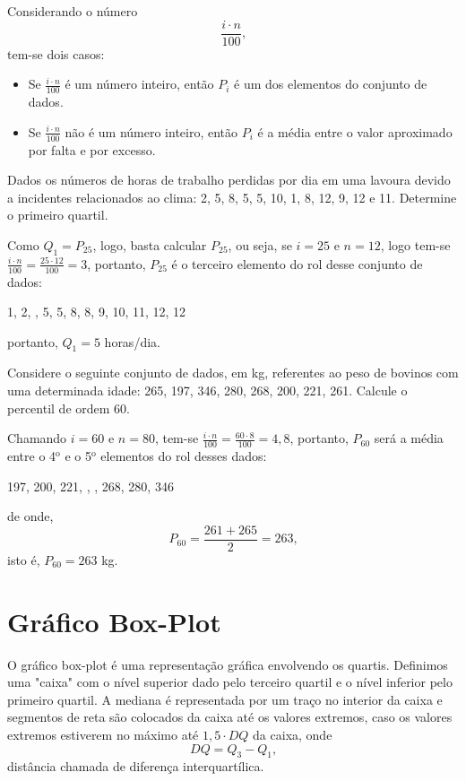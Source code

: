 \documentclass[11pt,fleqn]{book}
\numberwithin{mpicture}{chapter}
\numberwithin{mtable}{chapter}
\numberwithin{mframe}{chapter}
\begin{document}
Considerando o número
\[
\frac{i\cdot n}{100}\text{,}
\]
tem-se dois casos:
\begin{itemize}
	\item Se $\frac{i\cdot n}{100}$ é um número inteiro, então $P_i$ é um dos elementos do conjunto de dados.
	
	\item Se $\frac{i\cdot n}{100}$ não é um número inteiro, então $P_i$ é a média entre o valor aproximado por falta e por excesso.
\end{itemize}

\begin{example}
	Dados os números de horas de trabalho perdidas por dia em uma lavoura devido a incidentes relacionados ao clima: 2, 5, 8, 5, 5, 10, 1, 8, 12, 9, 12 e 11. Determine o primeiro quartil.
	
	Como $Q_1=P_{25}$, logo, basta calcular $P_{25}$, ou seja, se $i=25$ e $n=12$, logo tem-se $\frac{i\cdot n}{100}=\frac{25\cdot 12}{100}=3$, portanto, $P_{25}$ é o terceiro elemento do rol desse conjunto de dados:
	\begin{center}
		1, 2, , 5, 5, 8, 8, 9, 10, 11, 12, 12\text{,}
	\end{center}
	portanto, $Q_1=5$ horas/dia.
\end{example}

\begin{example}
	Considere o seguinte conjunto de dados, em kg, referentes ao peso de bovinos com uma determinada idade: 265, 197, 346, 280, 268, 200, 221, 261. Calcule o percentil de ordem 60.
	
	Chamando $i=60$ e $n=80$, tem-se $\frac{i\cdot n}{100}=\frac{60\cdot 8}{100}=4,8$, portanto, $P_{60}$ será a média entre o 4$^{\text{o}}$ e o 5$^{\text{o}}$ elementos do rol desses dados:
	\begin{center}
		197, 200, 221, , , 268, 280, 346\text{,}
	\end{center}
	de onde,
	\[
		P_{60}=\frac{261 + 265}{2}=263\text{,}
	\]
	isto é, $P_{60}=263$ kg.
\end{example}

\section{Gráfico Box-Plot}

O gráfico box-plot é uma representação gráfica envolvendo os quartis. Definimos uma "caixa" com o nível superior dado pelo terceiro quartil e o nível inferior pelo primeiro quartil. A mediana é representada por um traço no interior da caixa e segmentos de reta são colocados da caixa até os valores extremos, caso os valores extremos estiverem no máximo até $1,5\cdot DQ$ da caixa, onde
\[
DQ=Q_3-Q_1\text{,}
\]
distância chamada de diferença interquartílica. 
\end{document}

